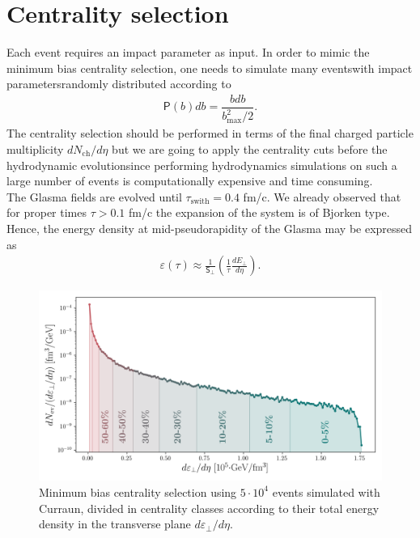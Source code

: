 \section{Centrality selection}
Each event requires an impact parameter as input. In order to mimic the minimum bias centrality selection, one needs to simulate many eventswith impact parametersrandomly distributed according to
\begin{align*}
    \textsf{P}(b)db=\dfrac{bdb}{b^2_\text{max}/2}.
\end{align*}
The centrality selection should be performed in terms of the final charged particle multiplicity $dN_\text{ch}/d\eta$ but we are going to apply the centrality cuts before the hydrodynamic evolutionsince performing hydrodynamics simulations on such a large number of events is computationally expensive and time consuming. \\
The Glasma fields are evolved until $\tau_\text{swith}=0.4$ fm/c. We already observed that for proper times $\tau>0.1$ fm/c the expansion of the system is of Bjorken type. Hence, the energy density at mid-pseudorapidity of the Glasma may be expressed as \cite{bjorken}
\begin{align*}
    \varepsilon(\tau)\approx \frac{1}{\textsf{S}_\perp}\left(\frac{1}{\tau}\frac{dE_\perp}{d\eta}\right).
\end{align*}

\vspace{-0.5cm}

\begin{figure}[h!]
	\includegraphics{images/centrality_cut.png}
	\caption{\normalsize Minimum bias centrality selection using $5\cdot 10^4$ events simulated with {\sffamily Curraun}, divided in centrality classes according to their total energy density in the transverse plane $d\varepsilon_\perp/d\eta$.}
\end{figure}

